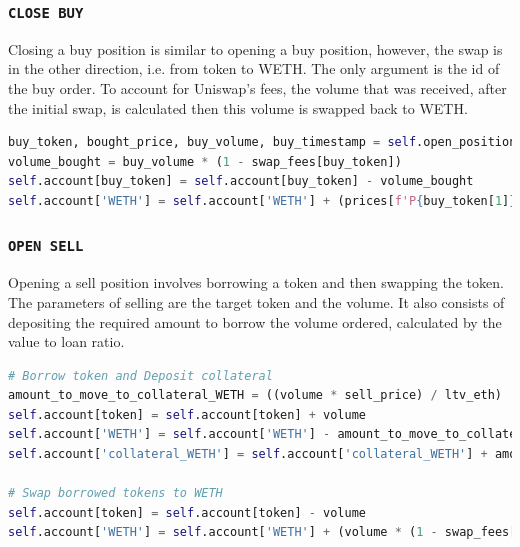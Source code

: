 \subsubsection{\texttt{CLOSE\ BUY}}
Closing a buy position is similar to opening a buy position, however, the swap is in the other direction, i.e. from token to WETH. The only argument is the id of the buy order. To account for Uniswap's fees, the volume that was received, after the initial swap, is calculated then this volume is swapped back to WETH.
\vspace{5mm}
\begin{lstlisting}[language=Python]
buy_token, bought_price, buy_volume, buy_timestamp = self.open_positions['BUY'][buy_id]
volume_bought = buy_volume * (1 - swap_fees[buy_token])
self.account[buy_token] = self.account[buy_token] - volume_bought
self.account['WETH'] = self.account['WETH'] + (prices[f'P{buy_token[1]}'] * (volume_bought * (1 - swap_fees[buy_token])))
\end{lstlisting}

\subsubsection{\texttt{OPEN\ SELL}}
Opening a sell position involves borrowing a token and then swapping the token. The parameters of selling are the target token and the volume. It also consists of depositing the required amount to borrow the volume ordered, calculated by the value to loan ratio.
\vspace{5mm}
\begin{lstlisting}[language=Python]
# Borrow token and Deposit collateral
amount_to_move_to_collateral_WETH = ((volume * sell_price) / ltv_eth)
self.account[token] = self.account[token] + volume
self.account['WETH'] = self.account['WETH'] - amount_to_move_to_collateral_WETH
self.account['collateral_WETH'] = self.account['collateral_WETH'] + amount_to_move_to_collateral_WETH

# Swap borrowed tokens to WETH
self.account[token] = self.account[token] - volume
self.account['WETH'] = self.account['WETH'] + (volume * (1 - swap_fees[token]) * sell_price)
\end{lstlisting}

